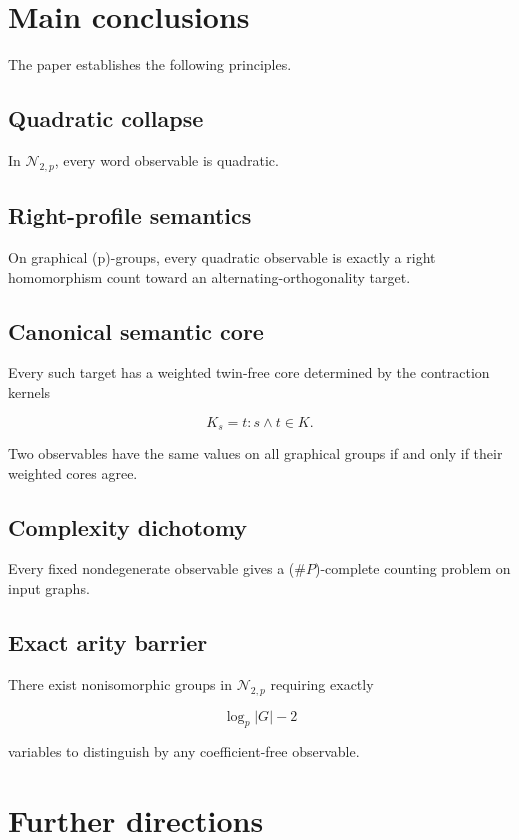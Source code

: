 \documentclass[11pt]{article}
\begin{document}
\section{Main conclusions}

The paper establishes the following principles.

\subsection{Quadratic collapse}

In $\mathcal N_{2,p}$, every word observable is quadratic.

\subsection{Right-profile semantics}

On graphical (p)-groups, every quadratic observable is exactly a right homomorphism count toward an alternating-orthogonality target.

\subsection{Canonical semantic core}

Every such target has a weighted twin-free core determined by the contraction kernels

\[
K_s={t:s\wedge t\in K}.
\]

Two observables have the same values on all graphical groups if and only if their weighted cores agree.

\subsection{Complexity dichotomy}

Every fixed nondegenerate observable gives a ($\#P$)-complete counting problem on input graphs.

\subsection{Exact arity barrier}

There exist nonisomorphic groups in $\mathcal N_{2,p}$ requiring exactly

\[
\log_p|G|-2
\]

variables to distinguish by any coefficient-free observable.

\section{Further directions}
\end{document}
